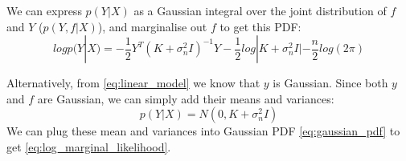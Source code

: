 We can express $p(Y|X)$ as a Gaussian integral over the joint distribution of $f$ and $Y$ ($p(Y,f|X)$), and marginalise out $f$ to get this PDF:
\begin{equation} \label{eq:log_marginal_likelihood}
    log p(Y|X) = -\frac{1}{2}Y^T(K + \sigma^2_nI)^{-1}Y - \frac{1}{2}log|K + \sigma^2_nI| - \frac{n}{2}log(2\pi)
\end{equation}

Alternatively, from \ref{eq:linear_model} we know that $y$ is Gaussian. Since both $y$ and $f$ are Gaussian, we can simply add their means and variances: 
\begin{equation*}
    p(Y|X) = N(0, K + \sigma^2_nI)
\end{equation*}
We can plug these mean and variances into Gaussian PDF \ref{eq:gaussian_pdf} to get \ref{eq:log_marginal_likelihood}.



